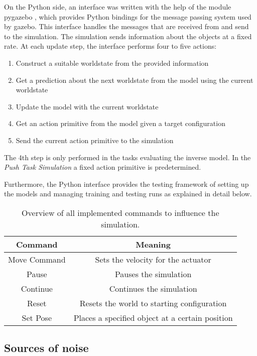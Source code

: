 On the Python side, an interface was written with the help of the module pygazebo \cite{pygazebo}, which provides Python bindings for the message passing system used by gazebo. This interface handles the messages that are received from and send to the simulation. 
The simulation sends information about the objects at a fixed rate. At each update step, the interface performs four to five actions:
\begin{enumerate}
\item Construct a suitable worldstate from the provided information
\item Get a prediction about the next worldstate from the model using the current worldstate
\item Update the model with the current worldstate
\item Get an action primitive from the model given a target configuration
\item Send the current action primitive to the simulation
\end{enumerate}

The 4th step is only performed in the tasks evaluating the inverse model. In the \textit{Push Task Simulation} a fixed action primitive is predetermined.

Furthermore, the Python interface provides the testing framework of setting up the models and managing training and testing runs as explained in detail below.

\begin{table}
	\centering
	\begin{tabular}{|c|c|}
		\hline \textbf{Command} & \textbf{Meaning} \\ 
		\hline Move Command & Sets the velocity for the actuator \\ 
		\hline Pause & Pauses the simulation \\
		\hline Continue & Continues the simulation \\
		\hline Reset & Resets the world to starting configuration \\
		\hline Set Pose & Places a specified object at a certain position \\
		\hline
	\end{tabular} 
	\caption{Overview of all implemented commands to influence the simulation.}
	\label{tab:commands}
\end{table}

\subsection{Sources of noise}

